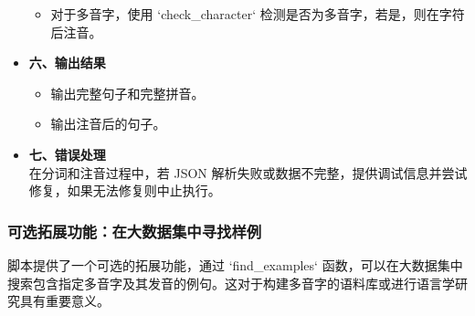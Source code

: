 \documentclass[12pt,hyperref,a4paper,UTF8]{ctexart}
\begin{document}
\begin{itemize}
\begin{itemize}
  \item 对于多音字，使用 `check\_character` 检测是否为多音字，若是，则在字符后注音。
\end{itemize}
  \item \textbf{六、输出结果}
  \begin{itemize}
  \item 输出完整句子和完整拼音。
  \item 输出注音后的句子。
\end{itemize}
  \item \textbf{七、错误处理}\\
  在分词和注音过程中，若 JSON 解析失败或数据不完整，提供调试信息并尝试修复，如果无法修复则中止执行。
\end{itemize}
\subsubsection{可选拓展功能：在大数据集中寻找样例}
脚本提供了一个可选的拓展功能，通过 `find\_examples` 函数，可以在大数据集中搜索包含指定多音字及其发音的例句。这对于构建多音字的语料库或进行语言学研究具有重要意义。
\end{document}
